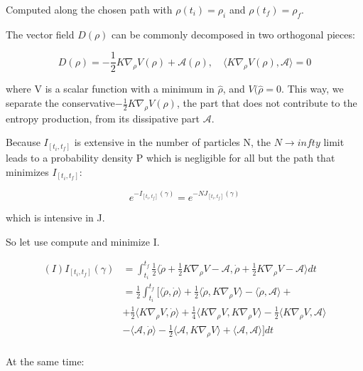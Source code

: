 \documentclass{article}
\begin{document}
Computed along the chosen path with $\rho(t_i) = \rho_i$ and  $\rho(t_f) = \rho_f$.

The vector field $D(\rho)$ can be commonly decomposed in two orthogonal pieces: 

$$D(\rho) = -\frac{1}{2} K \nabla_{\rho} V(\rho) + \mathcal{A}(\rho), \quad \langle K \nabla_{\rho} V(\rho), \mathcal{A} \rangle =0 $$

where V is a scalar function with a minimum in $\hat{\rho}$, and $V(\hat{\rho}=0$.
This way, we separate the conservative$ -\frac{1}{2} K \nabla_{\rho} V(\rho)$, the part that does not contribute to the entropy production, from its dissipative part $\mathcal{A}$.

Because  $I_{[t_i,t_f]}$ is extensive in the number of particles N, the $N \to 	infty $ limit leads to a probability density P which is negligible for all but the path that minimizes $I_{[t_i,t_f]}$:

$$ e^{-I_{[t_i,t_f]}(\gamma)} = e^{-NJ_{[t_i,t_f]}(\gamma)}$$

which is intensive in J.

So let use compute and minimize I.

\begin{align*}
(I) I_{[t_i,t_f]}(\gamma) & = \int_{t_i}^{t_f} \frac{1}{2} \langle \dot{\rho} +\frac{1}{2} K \nabla_{\rho} V - \mathcal{A} , \dot{\rho} +\frac{1}{2} K \nabla_{\rho} V - \mathcal{A} \rangle dt \\
& =  \frac{1}{2} \int_{t_i}^{t_f} \Big [ \langle  \dot{\rho},  \dot{\rho} \rangle +  \frac{1}{2}  \langle \dot{\rho},  K \nabla_{\rho} V \rangle -  \langle  \dot{\rho},\mathcal{A} \rangle + \\
& +  \frac{1}{2} \langle K \nabla_{\rho} V , \dot{\rho} \rangle + \frac{1}{4} \langle K \nabla_{\rho} V , K \nabla_{\rho} V \rangle -  \frac{1}{2} \langle K \nabla_{\rho} V ,\mathcal{A} \rangle  \\
& - \langle \mathcal{A}, \dot{\rho} \rangle - \frac{1}{2}  \langle \mathcal{A},  K \nabla_{\rho} V \rangle +  \langle \mathcal{A}, \mathcal{A} \rangle \Big] dt \\
\end{align*}

At the same time:
\end{document}
